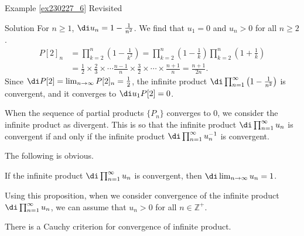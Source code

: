 \begin{example}{\linkt Example \ref{ex230227_6} Revisited}
\begin{example}[label=ex230227_13]{}
 
\begin{solution}{Solution}
 For $n\geq 1$, $\di u_n=1-\frac{1}{n^2}$. We find that $u_1=0$ and $u_n>0$ for all $n\geq 2$.
\begin{align*}
P[2]_n&=\prod_{k=2}^n\left(1-\frac{1}{k^2}\right)=\prod_{k=2}^n\left(1-\frac{1}{k}\right)\prod_{k=2}^n\left(1+\frac{1}{k}\right)\\
&=\frac{1}{2}\times\frac{2}{3}\times\cdots\frac{n-1}{n}\times\frac{3}{2}\times\cdots\times\frac{n+1}{n}=\frac{n+1}{2n}.
\end{align*}Since $\di P[2]=\lim_{n\to\infty}P[2]_n=\frac{1}{2}$, the infinite product $\di\prod_{n=1}^{\infty}\left(1-\frac{1}{n^2}\right)$ is convergent, and it converges to $\di u_1P[2]=0$.
 
\end{solution}

\begin{highlight}{}When the sequence of  partial products $\{P_{n}\}$ converges to 0, we consider the infinite product as divergent. This is so that the infinite product $\di\prod_{n=1}^{\infty} u_n$ is convergent if and only if the infinite product $\di \prod_{n=1}^{\infty} u_n^{-1}$ is convergent. \end{highlight}

 

The following is obvious. 
\begin{proposition}{} If the infinite product $\di\prod_{n=1}^{\infty}u_n$ is convergent, then 
$\di\lim_{n\rightarrow\infty}u_n=1$.
\end{proposition}
Using this proposition, when we consider convergence of the infinite product $\di\prod_{n=1}^{\infty}u_n$, we can assume that $u_n>0$ for all $n\in\mathbb{Z}^+$.
 

There is a Cauchy criterion for convergence of infinite product.


\end{example}
\end{example}
